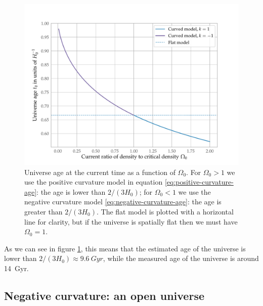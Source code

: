 \documentclass[main.tex]{subfiles}
\begin{document}
\begin{figure}[ht]
\centering
\includegraphics[width=\textwidth]{figures/curved_universe_age}
\caption{Universe age at the current time as a function of \(\Omega_0 \). For \(\Omega_0>1\) we use the positive curvature model in equation \eqref{eq:positive-curvature-age}: the age is lower than \(2/(3H_0 )\); for \(\Omega_0 <1\) we use the negative curvature model \eqref{eq:negative-curvature-age}: the age is greater than \(2/(3H_0 )\).
The flat model is plotted with a horizontal line for clarity, but if the universe is spatially flat then we must have \(\Omega_0 =1\).}
\label{fig:curved_universe_age}
\end{figure}

As we can see in figure \ref{fig:curved_universe_age}, this means that the estimated age of the universe is lower than \(2/(3H_0 ) \approx \SI{9.6}{Gyr}\), while the measured age of the universe is around \SI{14}{Gyr}.

\subsection{Negative curvature: an open universe}
\end{document}
